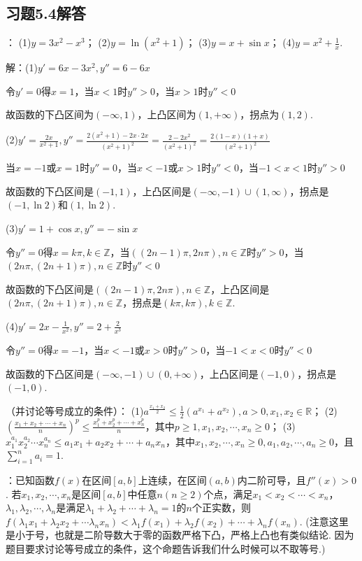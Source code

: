 \documentclass[12pt,UTF8]{ctexart}
\begin{document}
\subsection{习题5.4解答}
\begin{enumerate}
：
\newline
(1)$y=3x^2-x^3$；
\newline
(2)$y=\ln(x^2+1)$；
\newline
(3)$y=x+\sin x$；
\newline
(4)$y=x^2+\frac1x$.

解：(1)$y'=6x-3x^2,y''=6-6x$

令$y'=0$得$x=1$，当$x<1$时$y''>0$，当$x>1$时$y''<0$

故函数的下凸区间为$(-\infty,1)$，上凸区间为$(1,+\infty)$，拐点为$(1,2)$.

(2)$y'=\frac{2x}{x^2+1},y''=\frac{2(x^2+1)-2x\cdot2x}{(x^2+1)^2}=\frac{2-2x^2}{(x^2+1)^2}=\frac{2(1-x)(1+x)}{(x^2+1)^2}$

当$x=-1$或$x=1$时$y''=0$，当$x<-1$或$x>1$时$y''<0$，当$-1<x<1$时$y''>0$

故函数的下凸区间是$(-1,1)$，上凸区间是$(-\infty,-1)\cup(1,\infty)$，拐点是$(-1,\ln2)$和$(1,\ln2)$.

(3)$y'=1+\cos x,y''=-\sin x$

令$y''=0$得$x=k\pi,k\in\mathbb Z$，当$((2n-1)\pi,2n\pi),n\in\mathbb Z$时$y''>0$，当$(2n\pi,(2n+1)\pi),n\in\mathbb Z$时$y''<0$

故函数的下凸区间是$((2n-1)\pi,2n\pi),n\in\mathbb Z$，上凸区间是$(2n\pi,(2n+1)\pi),n\in\mathbb Z$，拐点是$(k\pi,k\pi),k\in\mathbb Z$.

(4)$y'=2x-\frac1{x^2},y''=2+\frac{2}{x^3}$

令$y''=0$得$x=-1$，当$x<-1$或$x>0$时$y''>0$，当$-1<x<0$时$y''<0$

故函数的下凸区间是$(-\infty,-1)\cup(0,+\infty)$，上凸区间是$(-1,0)$，拐点是$(-1,0)$.

（并讨论等号成立的条件）：
\newline
(1)$a^{\frac{x_1+x_2}2}\leq\frac12(a^{x_1}+a^{x_2}),a>0,x_1,x_2\in\mathbb R$；
\newline
(2)$(\frac{x_1+x_2+\cdots+x_n}n)^p\leq\frac{x_1^p+x_2^p+\cdots+x_n^p}n$，其中$p\geq1,x_1,x_2,\cdots,x_n\geq0$；
\newline
(3)$x_1^{a_1}x_2^{a_2}\cdots x_n^{a_n}\leq a_1x_1+a_2x_2+\cdots+a_nx_n$，其中$x_1,x_2,\cdots,x_n\geq0,a_1,a_2,\cdots,a_n\geq0$，且$\sum_{i=1}^na_i=1$.

{：已知函数$f(x)$在区间$[a,b]$上连续，在区间$(a,b)$内二阶可导，且$f''(x)>0$. 若$x_1,x_2,\cdots,x_n$是区间$[a,b]$中任意$n(n\geq2)$个点，满足$x_1<x_2<\cdots<x_n$，$\lambda_1,\lambda_2,\cdots,\lambda_n$是满足$\lambda_1+\lambda_2+\cdots+\lambda_n=1$的$n$个正实数，则$f(\lambda_1x_1+\lambda_2x_2+\cdots\lambda_nx_n)<\lambda_1f(x_1)+\lambda_2f(x_2)+\cdots+\lambda_nf(x_n)$. (注意这里是小于号，也就是二阶导数大于零的函数严格下凸，严格上凸也有类似结论. 因为题目要求讨论等号成立的条件，这个命题告诉我们什么时候可以不取等号.)

}
\end{enumerate}
\end{document}
